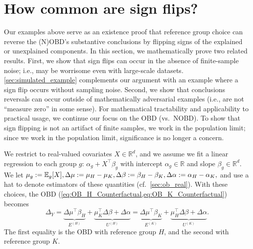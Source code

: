 \section{How common are sign flips?} 
\label{sec:signflips}

Our examples above serve as an existence proof that reference group choice can reverse the (N)OBD's substantive conclusions by flipping signs of the explained or unexplained components.
In this section, we mathematically prove two related results.
First, we show that sign flips can occur in the absence of finite-sample noise; i.e., may be worrisome even with large-scale datasets.
\cref{sec:simulated_example} complements our argument with an example where a sign flip occurs without sampling noise.
Second, we show that conclusions reversals can occur outside of mathematically adversarial examples (i.e., are not ``measure zero'' in some sense).
For mathematical tractability and applicability to practical usage, we continue our focus on the OBD (vs.\ NOBD). %
To show that sign flipping is not an artifact of finite samples, we work in the population limit; since we work in the population limit, significance is no longer a concern.

We restrict to real-valued covariates $X \in \mathbb{R}^d$, and we assume we fit a linear regression to each group $g$: $\alpha_g + X^\top \beta_g$
with intercept $\alpha_g \in \mathbb{R}$ and slope $\beta_g \in \mathbb{R}^d$. We let
$\mu_g := \mathbb{E}_g[X],
\Delta \mu := \mu_H - \mu_K,
\Delta \beta := \beta_H - \beta_K,
\Delta \alpha := \alpha_H - \alpha_K,
$
and use a hat to denote estimators of these quantities (cf.\ \cref{sec:ob_real}).
With these choices, the OBD
(\cref{eq:OB_H_Counterfactual,eq:OB_K_Counterfactual}) becomes
\begin{equation}
    \Delta_Y = \underbrace{\Delta \mu^\top \beta_H}_{E^{(H)}} + \underbrace{\mu_K^\top \Delta \beta + \Delta \alpha}_{U^{(H)}} = \underbrace{\Delta \mu^\top \beta_K}_{E^{(K)}} + \underbrace{\mu_H^\top \Delta \beta + \Delta \alpha}_{U^{(K)}}.
\end{equation}
The first equality is the OBD with reference group $H$, and the second with reference group $K$.


